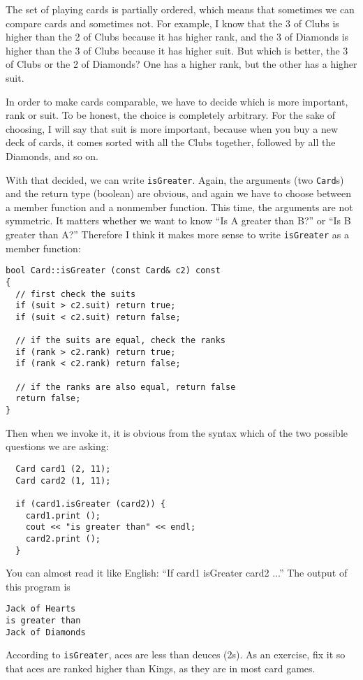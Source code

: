 The set of playing cards is partially ordered, which means that
sometimes we can compare cards and sometimes not.  For example, I know
that the 3 of Clubs is higher than the 2 of Clubs because it has
higher rank, and the 3 of Diamonds is higher than the 3 of Clubs
because it has higher suit.  But which is better, the 3 of Clubs or
the 2 of Diamonds?  One has a higher rank, but the other has a higher
suit.


In order to make cards comparable, we have to decide which is more
important, rank or suit.  To be honest, the choice is completely
arbitrary.  For the sake of choosing, I will say that suit is more
important, because when you buy a new deck of cards, it comes sorted
with all the Clubs together, followed by all the Diamonds, and so on.

With that decided, we can write {\tt isGreater}.  Again, the arguments
(two {\tt Card}s) and the return type (boolean) are obvious, and again
we have to choose between a member function and a nonmember function.
This time, the arguments are not symmetric.  It matters whether we
want to know ``Is A greater than B?'' or ``Is B greater than A?''
Therefore I think it makes more sense to write {\tt isGreater} as a
member function:

\begin{verbatim}
bool Card::isGreater (const Card& c2) const
{
  // first check the suits
  if (suit > c2.suit) return true;
  if (suit < c2.suit) return false;

  // if the suits are equal, check the ranks
  if (rank > c2.rank) return true;
  if (rank < c2.rank) return false;

  // if the ranks are also equal, return false
  return false;
}
\end{verbatim}
%
Then when we invoke it, it is obvious from the syntax which
of the two possible questions we are asking:

\begin{verbatim}
  Card card1 (2, 11);
  Card card2 (1, 11);

  if (card1.isGreater (card2)) {
    card1.print ();
    cout << "is greater than" << endl;
    card2.print ();
  }
\end{verbatim}
%
You can almost read it like English: ``If card1 isGreater card2 ...''
The output of this program is

\begin{verbatim}
Jack of Hearts
is greater than
Jack of Diamonds
\end{verbatim}
%
According to {\tt isGreater}, aces are
less than deuces (2s).
As an exercise, fix it so that aces are ranked higher than Kings,
as they are in most card games.

